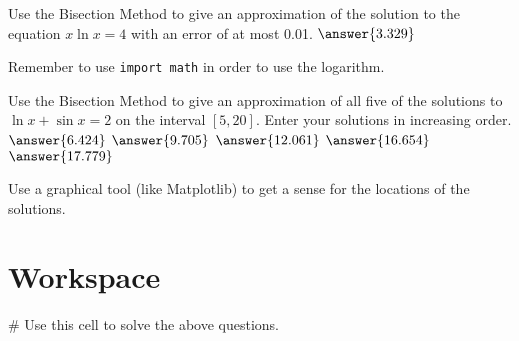 \documentclass{ximera}
\begin{document}
\begin{question}
	Use the Bisection Method to give an approximation of the solution to the equation $x\ln{x}=4$ with an error of at most 0.01. $\answer{3.329}$
	\begin{hint}
		Remember to use \verb|import math| in order to use the logarithm.
	\end{hint}
\end{question}

\begin{question}
	Use the Bisection Method to give an approximation of all five of the solutions to $\ln{x}+\sin{x}=2$ on the interval $[5,20]$. Enter your solutions in increasing order. $\answer{6.424}$ $\answer{9.705}$ $\answer{12.061}$ $\answer{16.654}$ $\answer{17.779}$
	\begin{hint}
		Use a graphical tool (like Matplotlib) to get a sense for the locations of the solutions.
	\end{hint}
\end{question}

\section{Workspace}

\begin{sageCell}
# Use this cell to solve the above questions.
\end{sageCell}
\end{document}
